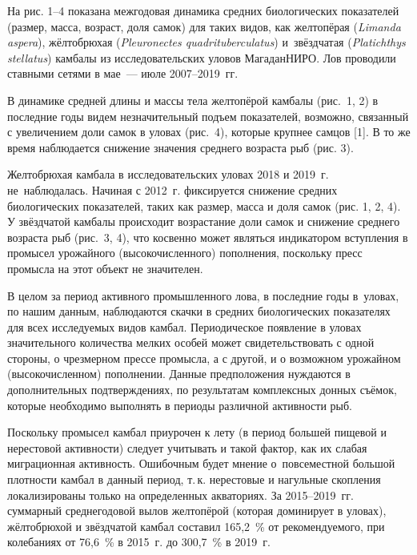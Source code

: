 На рис. 1--4 показана межгодовая динамика средних биологических показателей (размер, масса, возраст, доля самок) для таких видов, как желтопёрая (\textit{Limanda aspera}), жёлтобрюхая (\textit{Pleuronectes quadrituberculatus}) и~звёздчатая (\textit{Platichthys stellatus}) камбалы из исследовательских уловов МагаданНИРО. Лов проводили ставными сетями в мае~--- июле 2007--2019~гг.
\clearpage





В динамике средней длины и массы тела желтопёрой камбалы (рис.~1, 2) в последние годы видем незначительный подъем показателей, возможно, связанный с увеличением доли самок в уловах (рис. 4), которые крупнее самцов [1]. В то же время наблюдается снижение значения среднего возраста рыб (рис. 3).

Желтобрюхая камбала в исследовательских уловах 2018 и 2019~г. не~наблюдалась. Начиная с 2012~г. фиксируется снижение средних биологических показателей, таких как размер, масса и доля самок (рис. 1, 2, 4).
\clearpage
У звёздчатой камбалы происходит возрастание доли самок и снижение среднего возраста рыб (рис. 3, 4), что косвенно может являться индикатором вступления в промысел урожайного (высокочисленного) пополнения, поскольку пресс промысла на этот объект не значителен.

В целом за период активного промышленного лова, в последние годы в~уловах, по нашим данным, наблюдаются скачки в средних биологических показателях для всех исследуемых видов камбал. Периодическое появление в уловах значительного количества мелких особей может свидетельствовать с одной стороны, о чрезмерном прессе промысла, а с другой, и о возможном урожайном (высокочисленном) пополнении. Данные предположения нуждаются в дополнительных подтверждениях, по результатам комплексных донных съёмок, которые необходимо выполнять в периоды различной активности рыб.

Поскольку промысел камбал приурочен к лету (в период большей пищевой и нерестовой активности) следует учитывать и такой фактор, как их слабая миграционная активность. Ошибочным будет мнение о~повсеместной большой плотности камбал в данный период, т.\,к. нерестовые и нагульные скопления локализированы только на определенных акваториях. За 2015--2019~гг. суммарный среднегодовой вылов желтопёрой (которая доминирует в уловах), жёлтобрюхой и звёздчатой камбал составил 165,2~\% от рекомендуемого, при колебаниях от 76,6~\% в 2015~г. до 300,7~\% в 2019~г.


